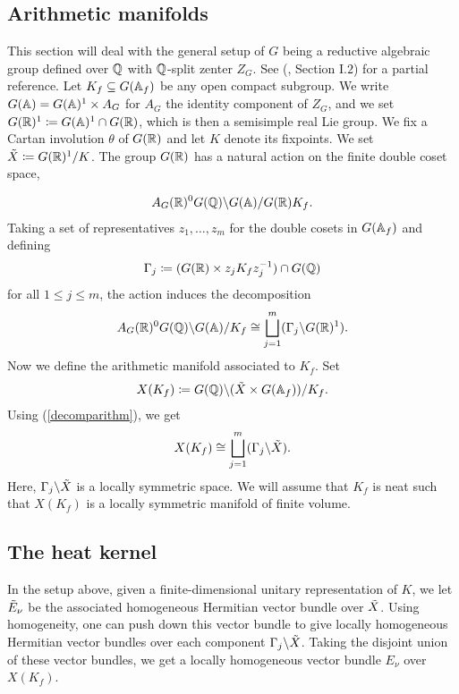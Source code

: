 \subsection{Arithmetic manifolds}\label{arithmfd}

This section will deal with the general setup of $G$ being a reductive algebraic group defined over $\mathbb{Q}$ with $\mathbb{Q}$-split zenter $Z_G$. See (\cite{Arthur0}, Section I.$2$) for a partial reference.  Let $K_f\subseteq G(\mathbb{A}_f)$ be any open compact subgroup. We write $G(\mathbb{A}) = G(\mathbb{A})^1\times A_G$ for $A_G$ the identity component of $Z_G$, and we set $G(\mathbb{R})^1\coloneqq G(\mathbb{A})^1\cap G(\mathbb{R})$, which is then a semisimple real Lie group. We fix a Cartan involution $\theta$ of $G(\mathbb{R})$ and let $K$ denote its fixpoints. We set $\Tilde{X}\coloneqq G(\mathbb{R})^1/K$. The group $G(\mathbb{R})$ has a natural action on the finite double coset space,

\begin{align*}
    A_G(\mathbb{R})^0G(\mathbb{Q})\backslash G(\mathbb{A})/G(\mathbb{R})K_f.
\end{align*}
Taking a set of representatives $z_1,\dots,z_m$ for the double cosets in $G(\mathbb{A}_f)$ and defining 
\begin{align*}
    \Gamma_j \coloneqq (G(\mathbb{R})\times z_jK_fz_j^{-1})\cap G(\mathbb{Q})
\end{align*}
for all $1\leq j\leq m$, the action induces the decomposition
\begin{align}\label{decomparithm}
    A_G(\mathbb{R})^0 G(\mathbb{Q})\backslash G(\mathbb{A})/K_f \cong \bigsqcup_{j=1}^m (\Gamma_j\backslash G(\mathbb{R})^1).
\end{align}
Now we define the arithmetic manifold associated to $K_f$. Set
\begin{align}\label{adelicsym}
    X(K_f)\coloneqq G(\mathbb{Q})\backslash (\Tilde{X} \times G(\mathbb{A}_f))/K_f.
\end{align}
Using (\ref{decomparithm}), we get
\begin{align}\label{decompsym}
    X(K_f)\cong \bigsqcup_{j=1}^m (\Gamma_j\backslash \Tilde{X}).
\end{align}
Here, $\Gamma_j\backslash \Tilde{X}$ is a locally symmetric space. We will assume that $K_f$ is neat such that $X(K_f)$ is a locally symmetric manifold of finite volume.

\subsection{The heat kernel}\label{heatker}

\noindent In the setup above, given a finite-dimensional unitary representation of $K$, we let $\Tilde{E}_\nu$ be the associated homogeneous Hermitian vector bundle over $\Tilde{X}$. Using homogeneity, one can push down this vector bundle to give locally homogeneous Hermitian vector bundles over each component $\Gamma_j\backslash \Tilde{X}$. Taking the disjoint union of these vector bundles, we get a locally homogeneous vector bundle $E_\nu$ over $X(K_f)$. 


